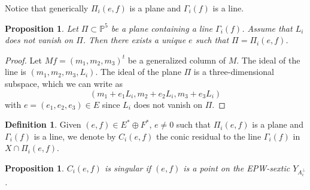\documentclass[11pt]{amsart}
\theoremstyle{plain}
\newtheorem{proposition}[theorem]{Proposition}
\numberwithin{equation}{section}
\theoremstyle{definition}
\newtheorem{definition}[theorem]{Definition}
\theoremstyle{remark}
\renewcommand{\P}{\mathbb P}
\begin{document}
Notice that generically $\Pi_i(e,f)$ is a plane and    $\Gamma_i(f)$ is a line. 

\begin{proposition}\label{pAllPlanes}
 Let $\Pi \subset \P^5$ be a plane containing a line $\Gamma_i(f)$. Assume that $L_i$ does not vanish on $\Pi$. Then 
there exists a unique $e$ such that $\Pi = \Pi_i(e,f)$. 
\end{proposition}

\begin{proof}
Let $Mf= (m_1, m_2, m_3)^t$ be a generalized column of $M$. The ideal of the line is $(m_1,m_2, m_3, L_i)$. The ideal of the plane $\Pi$ is a three-dimensional subspace, which we can write as 
\[
(m_1 + e_1L_i, m_2 + e_2L_i, m_3 + e_3L_i)
\]
with $e =(e_1,e_2, e_3) \in E$ since $L_i$ does not vanish on $\Pi$. 
\end{proof}

\begin{definition}\label{dConic}
Given $(e,f) \in E^* \oplus F^*$, $e \not=0$ such that $\Pi_i(e,f)$ is a plane and    $\Gamma_i(f)$ is a line, we denote by $C_i(e,f)$ the conic residual to the line $\Gamma_i (f)$ in $X \cap \Pi_i(e,f)$.
\end{definition}

\begin{proposition}\label{pSingular}
$C_i(e,f)$ is singular if  $(e,f)$ is a point on the EPW-sextic $Y_{A_i^\perp}$. 
\end{proposition}
\end{document}

